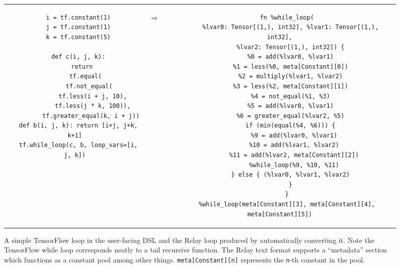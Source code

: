   \begin{figure*}[htb!]
    \begin{tabular}{ccc}
    \begin{minipage}{0.4\textwidth}
    \begin{verbatim}
  i = tf.constant(1)
  j = tf.constant(1)
  k = tf.constant(5)

  def c(i, j, k):
    return
      tf.equal(
        tf.not_equal(
          tf.less(i + j, 10),
          tf.less(j * k, 100)),
         tf.greater_equal(k, i + j))
  def b(i, j, k): return [i+j, j+k, k+1]
  tf.while_loop(c, b, loop_vars=[i, j, k])
    \end{verbatim}
    \end{minipage}
  & \hspace{-2.0em}
  \begin{Huge}
    $\Rightarrow$
  \end{Huge}
  &
    \begin{minipage}{0.5\textwidth}
    \begin{verbatim}
    fn %while_loop(
      %lvar0: Tensor[(1,), int32], %lvar1: Tensor[(1,), int32],
      %lvar2: Tensor[(1,), int32]) {
      %0 = add(%lvar0, %lvar1)
      %1 = less(%0, meta[Constant][0])
      %2 = multiply(%lvar1, %lvar2)
      %3 = less(%2, meta[Constant][1])
      %4 = not_equal(%1, %3)
      %5 = add(%lvar0, %lvar1)
      %6 = greater_equal(%lvar2, %5)
      if (min(equal(%4, %6))) {
        %9 = add(%lvar0, %lvar1)
        %10 = add(%lvar1, %lvar2)
        %11 = add(%lvar2, meta[Constant][2])
        %while_loop(%9, %10, %11)
      } else { (%lvar0, %lvar1, %lvar2)
      }
    }
    %while_loop(meta[Constant][3], meta[Constant][4], meta[Constant][5])
    \end{verbatim}
    \end{minipage}
    \end{tabular}
    \caption{\textmd{
      A simple TensorFlow loop in the user-facing DSL and the Relay
        loop produced by automatically converting it.
      Note the TensorFlow while loop corresponds neatly to a tail recursive
        function.
      The Relay text format supports a ``metadata'' section which functions
        as a constant pool among other things.
      \texttt{meta[Constant][n]} represents the \texttt{n}-th constant in the
        pool.
    }}
    \label{fig:tf_to_relay_loop}
    \end{figure*}

